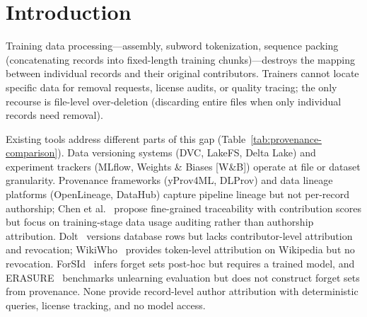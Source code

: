 \section{Introduction}

Training data processing---assembly, subword tokenization, sequence packing (concatenating records into fixed-length training chunks)---destroys the mapping between individual records and their original contributors. Trainers cannot locate specific data for removal requests, license audits, or quality tracing; the only recourse is file-level over-deletion (discarding entire files when only individual records need removal).

Existing tools address different parts of this gap (Table~\ref{tab:provenance-comparison}). Data versioning systems (DVC, LakeFS, Delta Lake) and experiment trackers (MLflow, Weights \& Biases [W\&B]) operate at file or dataset granularity. Provenance frameworks (yProv4ML, DLProv) and data lineage platforms (OpenLineage, DataHub) capture pipeline lineage but not per-record authorship; Chen et al.~\cite{chen2026finegrained} propose fine-grained traceability with contribution scores but focus on training-stage data usage auditing rather than authorship attribution. Dolt~\cite{dolt} versions database rows but lacks contributor-level attribution and revocation; WikiWho~\cite{flock2014wikiwho} provides token-level attribution on Wikipedia but no revocation. ForSId~\cite{dangelo2025forsid} infers forget sets post-hoc but requires a trained model, and ERASURE~\cite{dangelo2025erasure} benchmarks unlearning evaluation but does not construct forget sets from provenance. None provide record-level author attribution with deterministic queries, license tracking, and no model access.

